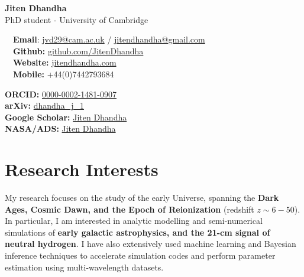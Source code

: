 \documentclass{article}
\begin{document}
\small %


\begin{center}
\huge
\textbf{Jiten Dhandha} \\
\normalsize
PhD student - University of Cambridge \\
\end{center}

\begin{minipage}[ht]{0.6\linewidth}
	\faEnvelope~~\textbf{Email}: \href{mailto:jvd29@cam.ac.uk}{jvd29@cam.ac.uk} / \href{mailto:jitendhandha@gmail.com}{jitendhandha@gmail.com} \\
	\faGithub~~\textbf{Github:} \href{https://github.com/JitenDhandha}{github.com/JitenDhandha}\\
	\faGlobe~~\textbf{Website:} \href{https://jitendhandha.com}{jitendhandha.com} \\
  \faPhone~~\textbf{Mobile:} +44(0)7442793684 \\
\end{minipage}
\begin{minipage}[ht]{0.34\linewidth}
	\begin{flushright}
    \textbf{ORCID:} \href{https://orcid.org/0000-0002-1481-0907}{0000-0002-1481-0907} \\
    \textbf{arXiv:} \href{https://arxiv.org/a/dhandha_j_1.html}{dhandha\_j\_1} \\
    \textbf{Google Scholar:} \href{https://scholar.google.com/citations?user=RjlmcA0AAAAJ}{Jiten Dhandha} \\
    \textbf{NASA/ADS:} \href{https://ui.adsabs.harvard.edu/search/?q=author%3A%22Dhandha%2C+Jiten%22}{Jiten Dhandha} \\
	\end{flushright}
\end{minipage}

\section*{Research Interests}

My research focuses on the study of the early Universe, spanning the \textbf{Dark Ages, Cosmic Dawn, and the Epoch of Reionization} (redshift $z\sim 6 - 50$). In particular, I am interested in analytic modelling and semi-numerical simulations of \textbf{early galactic astrophysics, and the 21-cm signal of neutral hydrogen}. I have also extensively used machine learning and Bayesian inference techniques to accelerate simulation codes and perform parameter estimation using multi-wavelength datasets.
\end{document}
